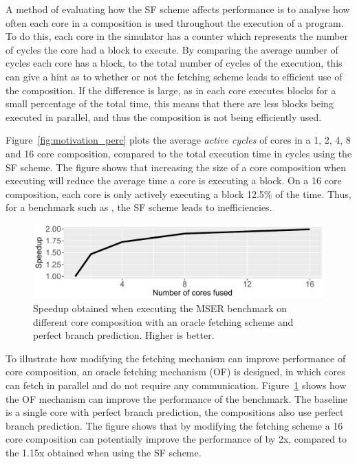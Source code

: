 A method of evaluating how the SF scheme affects performance is to analyse how often each core in a composition is used throughout the execution of a program.
To do this, each core in the simulator has a counter which represents the number of cycles the core had a block to execute.
By comparing the average number of cycles each core has a block, to the total number of cycles of the execution, this can give a hint as to whether or not the fetching scheme leads to efficient use of the composition.
If the difference is large, as in each core executes blocks for a small percentage of the total time, this means that there are less blocks being executed in parallel, and thus the composition is not being efficiently used.

Figure~\ref{fig:motivation_perc} plots the average \textit{active cycles} of cores in a 1, 2, 4, 8 and 16 core composition, compared to the total execution time in cycles using the SF scheme.
The figure shows that increasing the size of a core composition when executing  will reduce the average time a core is executing a block.
On a 16 core composition, each core is only actively executing a block 12.5\% of the time.
Thus, for a benchmark such as , the SF scheme leads to inefficiencies.

\begin{figure}[t]
    \centering
    \includegraphics[width=1\textwidth]{chapter3/graphics/perfect_fetch_motiv.pdf}
    \caption{Speedup obtained when executing the MSER benchmark on different core composition with an oracle fetching scheme and perfect branch prediction. Higher is better.}
    \label{fig:motivation_fetch}
	\vspace{1em}
\end{figure}

To illustrate how modifying the fetching mechanism can improve performance of core composition, an oracle fetching mechanism (OF) is designed, in which cores can fetch in parallel and do not require any communication.
Figure~\ref{fig:motivation_fetch} shows how the OF mechanism can improve the performance of the  benchmark.
The baseline is a single core with perfect branch prediction, the compositions also use perfect branch prediction.
The figure shows that by modifying the fetching scheme a 16 core composition can potentially improve the performance of  by 2x, compared to the 1.15x obtained when using the SF scheme.

